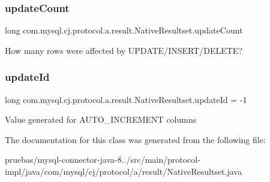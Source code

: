 \subsubsection{\texorpdfstring{update\+Count}{updateCount}}
{\footnotesize\ttfamily long com.\+mysql.\+cj.\+protocol.\+a.\+result.\+Native\+Resultset.\+update\+Count\hspace{0.3cm}{\ttfamily [protected]}}

How many rows were affected by U\+P\+D\+A\+T\+E/\+I\+N\+S\+E\+R\+T/\+D\+E\+L\+E\+TE? \mbox{\label{classcom_1_1mysql_1_1cj_1_1protocol_1_1a_1_1result_1_1_native_resultset_a204681a66f5f3a89ca1279af71ba4c35}} 
\subsubsection{\texorpdfstring{update\+Id}{updateId}}
{\footnotesize\ttfamily long com.\+mysql.\+cj.\+protocol.\+a.\+result.\+Native\+Resultset.\+update\+Id = -\/1\hspace{0.3cm}{\ttfamily [protected]}}

Value generated for A\+U\+T\+O\+\_\+\+I\+N\+C\+R\+E\+M\+E\+NT columns 

The documentation for this class was generated from the following file\+:\begin{DoxyCompactItemize}
\item 
pruebas/mysql-\/connector-\/java-\/8../src/main/protocol-\/impl/java/com/mysql/cj/protocol/a/result/Native\+Resultset.\+java\end{DoxyCompactItemize}
